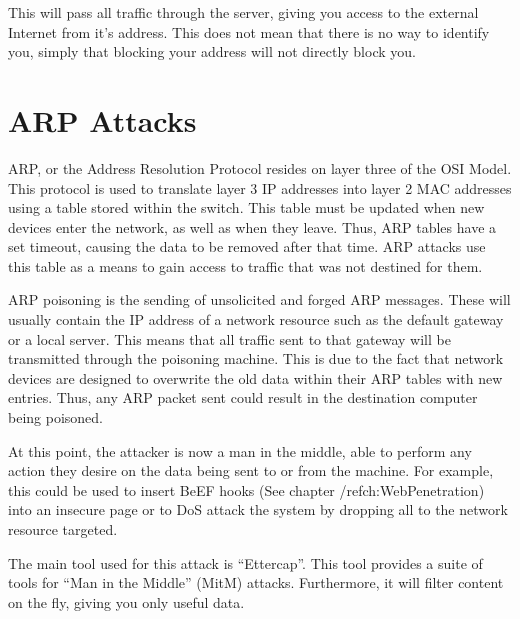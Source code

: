 		This will pass all traffic through the server, giving you access to the external Internet from it's address. 
		This does not mean that there is no way to identify you, simply that blocking your address will not directly block you. 

	\section{ARP Attacks}
		ARP, or the Address Resolution Protocol resides on layer three of the OSI Model. 
		This protocol is used to translate layer 3 IP addresses into layer 2 MAC addresses using a table stored within the switch. 
		This table must be updated when new devices enter the network, as well as when they leave. 
		Thus, ARP tables have a set timeout, causing the data to be removed after that time. 
		ARP attacks use this table as a means to gain access to traffic that was not destined for them. 

		ARP poisoning is the sending of unsolicited and forged ARP messages. 
		These will usually contain the IP address of a network resource such as the default gateway or a local server. 
		This means that all traffic sent to that gateway will be transmitted through the poisoning machine. 
		This is due to the fact that network devices are designed to overwrite the old data within their ARP tables with new entries. 
		Thus, any ARP packet sent could result in the destination computer being poisoned. 

		At this point, the attacker is now a man in the middle, able to perform any action they desire on the data being sent to or from the machine. 
		For example, this could be used to insert BeEF hooks (See chapter /ref{ch:WebPenetration}) into an insecure page or to DoS attack the system by dropping all to the network resource targeted. 

		The main tool used for this attack is ``Ettercap''. 
		This tool provides a suite of tools for ``Man in the Middle'' (MitM) attacks. 
		Furthermore, it will filter content on the fly, giving you only useful data. 

